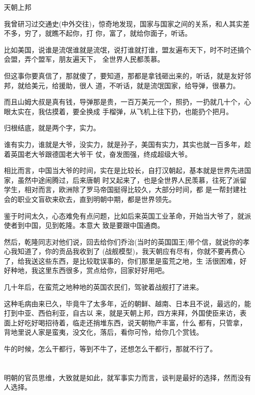 \documentclass[11pt,a4paper,onecolumn]{article}
\begin{document}
天朝上邦

我曾研习过交通史(中外交往)，惊奇地发现，国家与国家之间的关系，和人其实差不多，穷了，就瞧不起你，打
你，富了，就给你面子，听话。

比如美国，说谁是流氓谁就是流氓，说打谁就打谁，盟友遍布天下，时不时还搞个会盟，弄个盟军，朋友遍天下，
全世界人民都羡慕。

但这事你要真信了，那就傻了，要知道，那都是拿钱砸出来的，听话，就是友好邻邦，就给美元，给援助，很人
道，不听话，就是流氓国家，给导弹，很暴力。

而且山姆大叔是真有钱，导弹那是贵，一百万美元一个，照扔，一扔就几十个，心眼太实在，我估摸着，要全换成
手榴弹，从飞机上往下扔，也能扔个把月。

归根结底，就是两个字，实力。

谁有实力，谁就是大爷，没实力，就是孙子，美国有实力，其实也就一百多年，趁着英国老大爷跟德国老大爷干
仗，奋发图强，终成超级大爷。

相比而言，中国当大爷的时间，实在是比较长，自打汉朝起，基本就是世界先进国家，虽然中途闹腾过，后来唐朝
时又起来了，也是全世界人民羡慕，往死了派留学生，相对而言，欧洲除了罗马帝国挺得比较久，大部分时间，都
是一帮封建社会的职业文盲砍来砍去，直到明朝中期，都是世界领先。

鉴于时间太久，心态难免有点问题，比如后来英国工业革命，开始当大爷了，就派使者到中国，见到乾隆。本意大
致是要跟中国通商。

然后，乾隆同志对他们说，回去给你们乔治(当时的英国国王)带个信，就说你的孝心我知道了，你的贡品我收到了
(战舰模型)，我天朝应有尽有，你就不要再费心了，给我送这些东西，是比较耽误事的，你们那里是蛮荒之地，生
活很困难，好好种地，我这里东西很多，赏点给你，回家好好用吧。

几十年后，在蛮荒之地种地的英国农民们，驾驶着战舰打了进来。

这种毛病由来已久，毕竟牛了太多年，近的朝鲜、越南、日本且不说，最远的，能打到中亚、西伯利亚，自古以
来，就是天朝上邦，四方来拜，外国使臣来访，表面上好吃好喝招待着，临走还捎堆东西，说天朝物产丰富，什么
都有，只管拿，背地里说人家是蛮夷，没文化，落后，看你可怜，给你几个赏钱。

牛的时候，怎么干都行，等到不牛了，还想怎么干都行，那就不行了。

\section[\thesection]{}

明朝的官员思维，大致就是如此，就军事实力而言，谈判是最好的选择，然而没有人选择。
\end{document}
